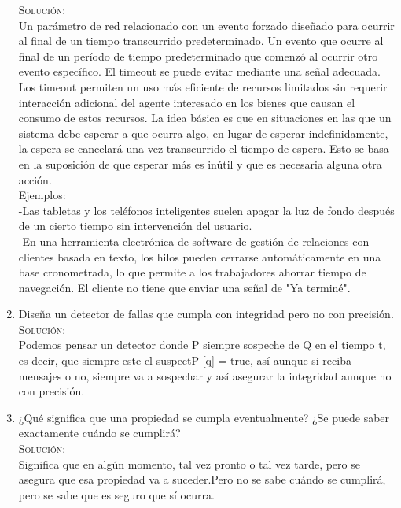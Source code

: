 \documentclass[letterpaper,10pt]{article}
\begin{document}
\begin{enumerate}
    \textsc{Solución:}
    \\
    Un parámetro de red relacionado con un evento forzado diseñado para ocurrir al final de un tiempo transcurrido predeterminado.
Un evento que ocurre al final de un período de tiempo predeterminado que comenzó al ocurrir otro evento específico. El timeout se puede evitar mediante una señal adecuada.\\
Los timeout permiten un uso más eficiente de recursos limitados sin requerir interacción adicional del agente interesado en los bienes que causan el consumo de estos recursos. La idea básica es que en situaciones en las que un sistema debe esperar a que ocurra algo, en lugar de esperar indefinidamente, la espera se cancelará una vez transcurrido el tiempo de espera. Esto se basa en la suposición de que esperar más es inútil y que es necesaria alguna otra acción.\\
Ejemplos:\\
	-Las tabletas y los teléfonos inteligentes suelen apagar la luz de fondo después de un cierto tiempo sin intervención del usuario.\\
	-En una herramienta electrónica de software de gestión de relaciones con clientes basada en texto, los hilos pueden cerrarse automáticamente en una base cronometrada, lo que permite a los trabajadores ahorrar tiempo de navegación. El cliente no tiene que enviar una señal de "Ya terminé".
	
	
    \item Diseña un detector de fallas que cumpla con integridad pero no con precisión.\\
    
    \textsc{Solución:}
    \\
    Podemos pensar un detector donde P siempre sospeche de Q en el tiempo t, es decir, que siempre este el suspectP [q] = true, así aunque si reciba mensajes o no, siempre va a sospechar y así asegurar la integridad aunque no con precisión.
	
    \item ¿Qué significa que una propiedad se cumpla eventualmente? ¿Se puede saber exactamente cuándo se cumplirá?\\
    
    \textsc{Solución:}
    \\
    Significa que en algún momento, tal vez pronto o tal vez tarde, pero se asegura que esa propiedad va a suceder.Pero no se sabe cuándo se cumplirá, pero se sabe que es seguro que sí ocurra.

	\end{enumerate} 
\end{document}
